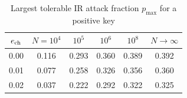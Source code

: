 \begin{table}[!t]
\caption{Largest tolerable IR attack fraction $p_{\max}$ for a positive key}
\label{tab:pmax}
\centering
\small
\begin{tabular}{@{}cccccc@{}}
\toprule
$e_{\mathrm{ch}}$ & $N=10^4$ & $10^5$ & $10^6$ & $10^8$ & $N\to\infty$ \\
\midrule
0.00 & 0.116 & 0.293 & 0.360 & 0.389 & 0.392 \\
0.01 & 0.077 & 0.258 & 0.326 & 0.356 & 0.360 \\
0.02 & 0.037 & 0.222 & 0.292 & 0.322 & 0.325 \\
\bottomrule
\end{tabular}
\end{table}
